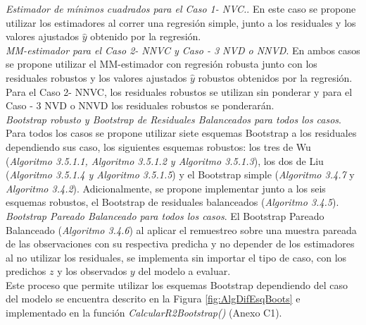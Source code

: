 \textit{Estimador de mínimos cuadrados para el Caso 1- NVC.}. En este caso se propone utilizar los estimadores al correr una regresión simple, junto a los residuales y los valores ajustados $\hat{y}$ obtenido por la regresión.\\


\textit{MM-estimador para el Caso 2- NNVC y  Caso - 3 NVD o NNVD}. En ambos casos se propone utilizar el MM-estimador con regresión robusta junto con los residuales robustos y los valores ajustados $\hat{y}$ robustos obtenidos por la regresión. Para el Caso 2- NNVC, los residuales robustos se utilizan sin ponderar y para el  Caso - 3 NVD o NNVD los residuales robustos se ponderarán.  \\



\textit{Bootstrap robusto y Bootstrap de Residuales Balanceados para todos los casos}. Para todos los casos se propone utilizar siete esquemas Bootstrap a los residuales dependiendo sus caso, los siguientes esquemas robustos: los tres de Wu (\textit{Algoritmo 3.5.1.1, Algoritmo 3.5.1.2 y Algoritmo 3.5.1.3}), los dos de Liu (\textit{Algoritmo 3.5.1.4 y Algoritmo 3.5.1.5}) y el Bootstrap simple (\textit{Algoritmo 3.4.7} y \textit{Algoritmo 3.4.2}). Adicionalmente, se propone implementar junto a los seis esquemas robustos, el Bootstrap de residuales balanceados (\textit{Algoritmo 3.4.5}). \\


\textit{Bootstrap Pareado Balanceado para todos los casos}. El Bootstrap Pareado Balanceado (\textit{Algoritmo 3.4.6}) al aplicar el remuestreo sobre una muestra pareada de las observaciones con su respectiva predicha y no depender de los estimadores al no utilizar los residuales, se implementa sin importar el tipo de caso, con los predichos $z$ y los observados $y$ del modelo a evaluar.\\

Este proceso que permite utilizar los esquemas Bootstrap dependiendo del caso del modelo se encuentra descrito en la Figura \ref{fig:AlgDifEsqBoots} e implementado en la función \textit{CalcularR2Bootstrap()} (Anexo C1).

 


